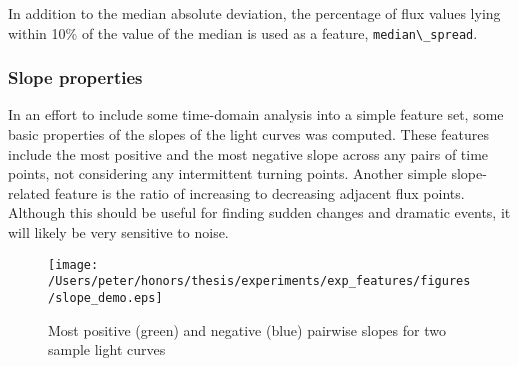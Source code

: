 	In addition to the median absolute deviation, the percentage of flux values lying within 10\% of the value of the median is used as a feature, \verb#median\_spread#.
	
	\subsubsection{Slope properties}
	In an effort to include some time-domain analysis into a simple feature set, some basic properties of the slopes of the light curves was computed. These features include the most positive and the most negative slope across any pairs of time points, not considering any intermittent turning points. Another simple slope-related feature is the ratio of increasing to decreasing adjacent flux points. Although this should be useful for finding sudden changes and dramatic events, it will likely be very sensitive to noise.
	
	\begin{figure}[ht!]
		\label{fig:slopesample}
		\texttt{[image: /Users/peter/honors/thesis/experiments/exp\_features/figures/slope\_demo.eps]}
		\caption{Most positive (green) and negative (blue) pairwise slopes for two sample light curves}
	\end{figure}
	
